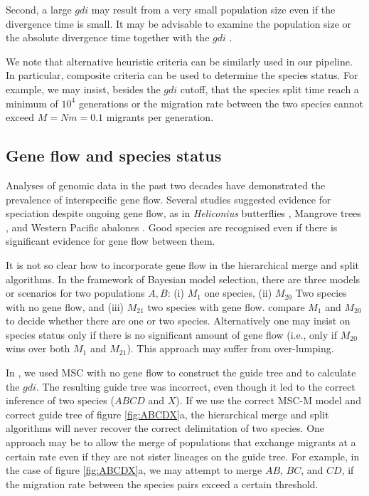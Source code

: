 \documentclass{article1}
\begin{document}
Second, a large $gdi$ may result from a very small population size even if the
divergence time is small.  It may be advisable to examine the population size or the
absolute divergence time together with the $gdi$ \citep{Rannala2020}.

We note that alternative heuristic criteria can be similarly used in our pipeline.  In
particular, composite criteria can be used to determine the species status.  For
example, we may insist, besides the $gdi$ cutoff, that the species split time reach a
minimum of $10^4$ generations \citep{Rannala2020} or the migration rate between the two
species cannot exceed $M = Nm = 0.1$ migrants per generation.

\subsection{Gene flow and species status}

Analyses of genomic data in the past two decades have demonstrated the prevalence of
interspecific gene flow.  Several studies suggested evidence for speciation despite
ongoing gene flow, as in \textit{Heliconius} butterflies \citep{Martin2013}, Mangrove
trees \citep{He2019}, and Western Pacific abalones \citep{Hirase2021}.  Good species are
recognised even if there is significant evidence for gene flow between them.

It is not so clear how to incorporate gene flow in the hierarchical merge and split
algorithms.  In the framework of Bayesian model selection, there are three models or
scenarios for two populations $A,B$: (i) $M_1$ one species, (ii) $M_{20}$ Two species
with no gene flow, and (iii) $M_{21}$ two species with gene flow.  \citet{Leache2019}
compare $M_1$ and $M_{20}$ to decide whether there are one or two species. Alternatively
one may insist on species status only if there is no significant amount of gene flow
(i.e., only if $M_{20}$ wins over both $M_1$ and $M_{21}$).  This approach may suffer
from over-lumping.

In \citet{Leache2019}, we used MSC with no gene flow to construct the guide tree and to
calculate the $gdi$.  The resulting guide tree \citep[][figure 3b]{Leache2019} was
incorrect, even though it led to the correct inference of two species ($ABCD$ and $X$). 
If we use the correct MSC-M model and correct guide tree of figure \ref{fig:ABCDX}a, the
hierarchical merge and split algorithms will never recover the correct delimitation of
two species.  One approach may be to allow the merge of populations that exchange
migrants at a certain rate even if they are not sister lineages on the guide tree.  For
example, in the case of figure \ref{fig:ABCDX}a, we may attempt to merge $AB$, $BC$, and
$CD$, if the migration rate between the species pairs exceed a certain threshold.
\end{document}
